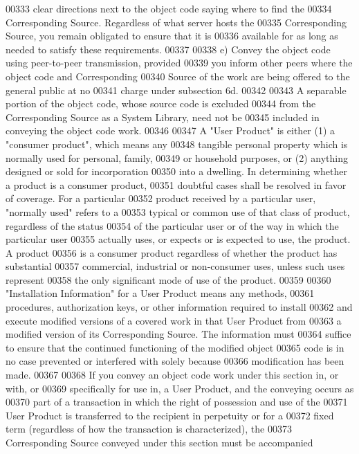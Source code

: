 \begin{DoxyCode}
00333     clear directions next to the object code saying where to find the
00334     Corresponding Source.  Regardless of what server hosts the
00335     Corresponding Source, you remain obligated to ensure that it is
00336     available for as long as needed to satisfy these requirements.
00337 
00338     e) Convey the object code using peer-to-peer transmission, provided
00339     you inform other peers where the object code and Corresponding
00340     Source of the work are being offered to the general public at no
00341     charge under subsection 6d.
00342 
00343   A separable portion of the object code, whose source code is excluded
00344 from the Corresponding Source as a System Library, need not be
00345 included in conveying the object code work.
00346 
00347   A "User Product" is either (1) a "consumer product", which means any
00348 tangible personal property which is normally used for personal, family,
00349 or household purposes, or (2) anything designed or sold for incorporation
00350 into a dwelling.  In determining whether a product is a consumer product,
00351 doubtful cases shall be resolved in favor of coverage.  For a particular
00352 product received by a particular user, "normally used" refers to a
00353 typical or common use of that class of product, regardless of the status
00354 of the particular user or of the way in which the particular user
00355 actually uses, or expects or is expected to use, the product.  A product
00356 is a consumer product regardless of whether the product has substantial
00357 commercial, industrial or non-consumer uses, unless such uses represent
00358 the only significant mode of use of the product.
00359 
00360   "Installation Information" for a User Product means any methods,
00361 procedures, authorization keys, or other information required to install
00362 and execute modified versions of a covered work in that User Product from
00363 a modified version of its Corresponding Source.  The information must
00364 suffice to ensure that the continued functioning of the modified object
00365 code is in no case prevented or interfered with solely because
00366 modification has been made.
00367 
00368   If you convey an object code work under this section in, or with, or
00369 specifically for use in, a User Product, and the conveying occurs as
00370 part of a transaction in which the right of possession and use of the
00371 User Product is transferred to the recipient in perpetuity or for a
00372 fixed term (regardless of how the transaction is characterized), the
00373 Corresponding Source conveyed under this section must be accompanied

\end{DoxyCode}
